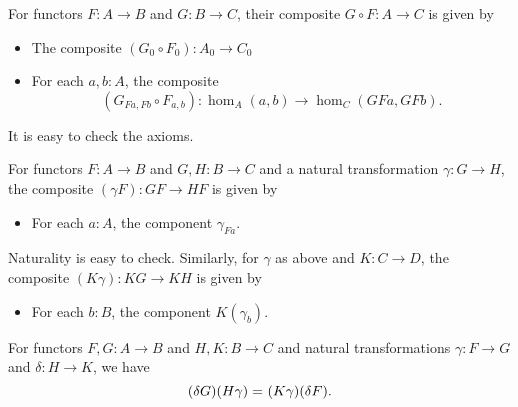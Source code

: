 \documentclass[hott-all.tex]{subfiles}
\begin{document}



\begin{defn}\label{ct:functor-composition}
  For functors $F:A\to B$ and $G:B\to C$, their composite $G\circ F:A\to C$ is given by
  \begin{itemize}
  \item The composite $(G_0\circ F_0) : A_0 \to C_0$
  \item For each $a,b:A$, the composite
    \[(G_{Fa,Fb}\circ F_{a,b}):\hom_A(a,b) \to \hom_C(GFa,GFb).\]
  \end{itemize}
  It is easy to check the axioms.
\end{defn}

\begin{defn}\label{ct:whisker}
  For functors $F:A\to B$ and $G,H:B\to C$ and a natural transformation $\gamma:G\to H$, the composite $(\gamma F):GF\to HF$ is given by
  \begin{itemize}
  \item For each $a:A$, the component $\gamma_{Fa}$.
  \end{itemize}
  Naturality is easy to check.
  Similarly, for $\gamma$ as above and $K:C\to D$, the composite $(K\gamma):KG\to KH$ is given by
  \begin{itemize}
  \item For each $b:B$, the component $K(\gamma_b)$.
  \end{itemize}
\end{defn}

\begin{lem}\label{ct:interchange}
  For functors $F,G:A\to B$ and $H,K:B\to C$ and natural transformations $\gamma:F\to G$ and $\delta:H\to K$, we have
  \[(\delta G)(H\gamma) =_{} (K\gamma)(\delta F).\]
\end{lem}
\end{document}

